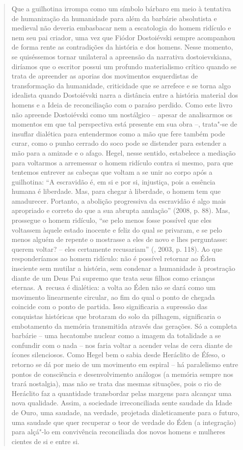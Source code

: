 {\begin{quote}
Que a guilhotina irrompa como um símbolo bárbaro em meio à tentativa de
humanização da humanidade para além da barbárie absolutista e medieval
não deveria embasbacar nem a escatologia do homem ridículo e nem seu pai
criador, uma vez que Fiódor Dostoiévski sempre acompanhou de forma rente
as contradições da história e dos homens. Nesse momento, se quiséssemos
tornar unilateral a apreensão da narrativa dostoievskiana, diríamos que
o escritor possui um profundo materialismo crítico quando se trata de
apreender as aporias dos movimentos esquerdistas de transformação da
humanidade, criticidade que se arrefece e se torna algo idealista quando
Dostoiévski narra a distância entre a história material dos homens e a
Ideia de reconciliação com o paraíso perdido. Como este livro não
apreende Dostoiévski como um nostálgico -- apesar de analisarmos os
momentos em que tal perspectiva está presente em sua obra --, trata"-se
de insuflar dialética para entendermos como a mão que fere também pode
curar, como o punho cerrado do soco pode se distender para estender a
mão para a amizade e o afago. Hegel, nesse sentido, estabelece a
mediação para voltarmos a arremessar o homem ridículo contra si mesmo,
para que tentemos entrever as cabeças que voltam a se unir ao corpo após
a guilhotina: ``A escravidão é, em si e por si, injustiça, pois a
essência humana é liberdade. Mas, para chegar à liberdade, o homem tem
que amadurecer. Portanto, a abolição progressiva da escravidão é algo
mais apropriado e correto do que a sua abrupta anulação'' (2008, p. 88).
Mas, prossegue o homem ridículo, ``se pelo menos fosse possível que eles
voltassem àquele estado inocente e feliz do qual se privaram, e se pelo
menos alguém de repente o mostrasse a eles de novo e lhes perguntasse:
querem voltar? -- eles certamente recusariam'' (, 2003, p.
118). Ao que responderíamos ao homem ridículo: não é possível retornar
ao Éden insciente sem mutilar a história, sem condenar a humanidade à
prostração diante de um Deus Pai supremo que trata seus filhos como
crianças eternas. A~recusa é dialética: a volta ao Éden não se dará como
um movimento linearmente circular, ao fim do qual o ponto de chegada
coincide com o ponto de partida. Isso significaria a supressão das
conquistas históricas que brotaram do solo da pilhagem, significaria o
embotamento da memória transmitida através das gerações. Só a completa
barbárie -- uma hecatombe nuclear como a imagem da totalidade a se
confundir com o nada -- nos faria voltar a acender velas de cera diante
de ícones silenciosos. Como Hegel bem o sabia desde Heráclito de Éfeso,
o retorno se dá por meio de um movimento em espiral -- há paralelismo
entre pontos de consciência e desenvolvimento análogos (a memória sempre
nos trará nostalgia), mas não se trata das mesmas situações, pois o rio
de Heráclito faz a quantidade transbordar pelas margens para alcançar
uma nova qualidade. Assim, a sociedade irreconciliada sente saudade da
Idade de Ouro, uma saudade, na verdade, projetada dialeticamente para o
futuro, uma saudade que quer recuperar o teor de verdade do Éden (a
integração) para alçá"-lo em convivência reconciliada dos novos homens e
mulheres cientes de si e entre si.


\end{quote}}
